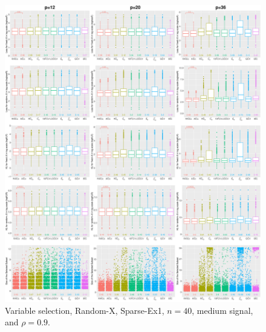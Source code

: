 \begin{figure}[!ht]
\centering
\includegraphics[width=\textwidth]{figures/supplement/randomx/subset_selection/Sparse-Ex1_n40_msnr_rho09.eps}
\caption{Variable selection, Random-X, Sparse-Ex1, $n=40$, medium signal, and $\rho=0.9$.}
\end{figure}
\clearpage
